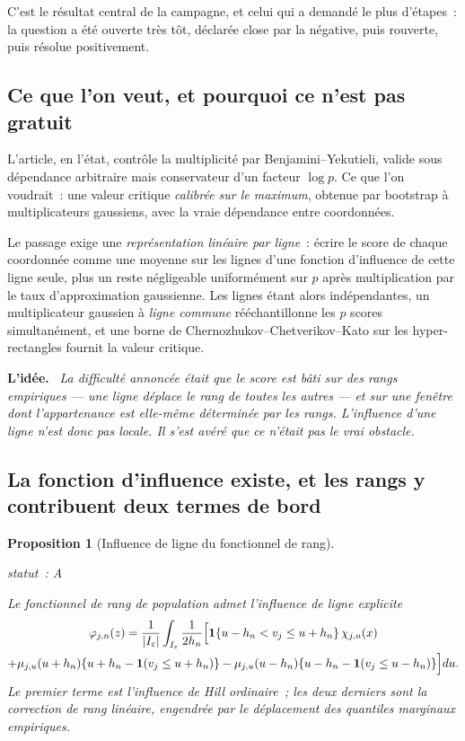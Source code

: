 \documentclass[11pt]{article}
\theoremstyle{plain}
\newtheorem{proposition}[theoreme]{Proposition}
\theoremstyle{definition}
\theoremstyle{remark}
\newcommand{\1}{\mathbf 1}
\newcommand{\I}{I_\varepsilon}
\newcommand{\statut}[1]{%
  \nopagebreak\par\nopagebreak
  \hfill{\normalfont\footnotesize\textcolor{gris}{statut~: #1}}%
  \par\nopagebreak\vspace{-2pt}}
\newenvironment{idee}
  {\par\medskip\noindent\textcolor{bleu}{\textbf{L'idée.}}\ \itshape}
  {\par\medskip}
\begin{document}
C'est le résultat central de la campagne, et celui qui a demandé le plus
d'étapes~: la question a été ouverte très tôt, déclarée close par la
négative, puis rouverte, puis résolue positivement.

\subsection{Ce que l'on veut, et pourquoi ce n'est pas gratuit}

L'article, en l'état, contrôle la multiplicité par Benjamini--Yekutieli,
valide sous dépendance arbitraire mais conservateur d'un facteur
$\log p$. Ce que l'on voudrait~: une valeur critique \emph{calibrée sur
le maximum}, obtenue par bootstrap à multiplicateurs gaussiens, avec la
vraie dépendance entre coordonnées.

Le passage exige une \emph{représentation linéaire par ligne}~: écrire le
score de chaque coordonnée comme une moyenne sur les lignes d'une
fonction d'influence de cette ligne seule, plus un reste négligeable
uniformément sur $p$ après multiplication par le taux d'approximation
gaussienne. Les lignes étant alors indépendantes, un multiplicateur
gaussien à \emph{ligne commune} rééchantillonne les $p$ scores
simultanément, et une borne de Chernozhukov--Chetverikov--Kato sur les
hyper-rectangles fournit la valeur critique.

\begin{idee}
La difficulté annoncée était que le score est bâti sur des \emph{rangs
empiriques} --- une ligne déplace le rang de toutes les autres --- et sur
une fenêtre dont l'appartenance est elle-même déterminée par les rangs.
L'influence d'une ligne n'est donc pas locale. Il s'est avéré que ce
n'était pas le vrai obstacle.
\end{idee}

\subsection{La fonction d'influence existe, et les rangs y contribuent deux termes de bord}

\begin{proposition}[Influence de ligne du fonctionnel de rang]
\label{prop:influence}
\statut{A}
Le fonctionnel de rang de population admet l'influence de ligne explicite
\begin{multline}
 \varphi_{j,n}(z)=\frac1{|\I|}\int_{\I}\frac1{2h_n}
 \Bigl[\1\{u-h_n<v_j\le u+h_n\}\,\chi_{j,u}(x)\\
 +\mu_{j,u}(u+h_n)\{u+h_n-\1(v_j\le u+h_n)\}
 -\mu_{j,u}(u-h_n)\{u-h_n-\1(v_j\le u-h_n)\}\Bigr]du .
 \label{eq:influence}
\end{multline}
Le premier terme est l'influence de Hill ordinaire~; les deux derniers
sont la \emph{correction de rang linéaire}, engendrée par le déplacement
des quantiles marginaux empiriques.
\end{proposition}
\end{document}
